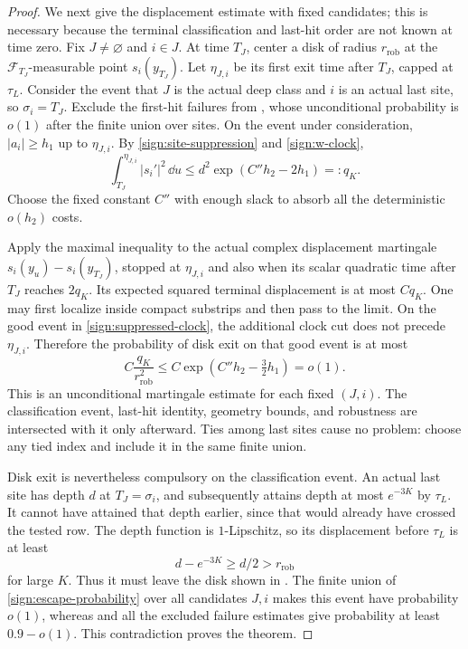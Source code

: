 \begin{proof}
We next give the displacement estimate with fixed candidates; this
is necessary because the terminal classification and last-hit order
are not known at time zero.  Fix \(J\ne\varnothing\) and \(i\in J\).
At time \(T_J\), center a disk of radius \(r_{\mathrm{rob}}\) at
the \(\mathcal F_{T_J}\)-measurable point \(s_i(y_{T_J})\).
Let \(\eta_{J,i}\) be its first exit time after \(T_J\), capped at
\(\tau_L\).  Consider the event that \(J\) is the actual deep
class and \(i\) is an actual last site, so \(\sigma_i=T_J\).
Exclude the first-hit failures from , whose
unconditional probability is \(o(1)\) after the finite union over
sites.  On the event under consideration, \(|a_i|\ge h_1\) up to
\(\eta_{J,i}\).  By \eqref{sign:site-suppression} and
\eqref{sign:w-clock},
\begin{equation}\label{sign:suppressed-clock}
 \int_{T_J}^{\eta_{J,i}}|s_i'|^2\,\dd u
       \le d^2\exp(C''h_2-2h_1)=:q_K.
\end{equation}
Choose the fixed constant \(C''\) with enough slack to absorb all
the deterministic \(o(h_2)\) costs.

Apply the maximal inequality to the actual complex displacement
martingale
\(s_i(y_u)-s_i(y_{T_J})\), stopped at \(\eta_{J,i}\) and also
when its scalar quadratic time after \(T_J\) reaches \(2q_K\).
Its expected squared terminal displacement is at most \(Cq_K\).
One may first localize inside compact substrips and then pass to
the limit.  On the good event in \eqref{sign:suppressed-clock},
the additional clock cut does not precede \(\eta_{J,i}\).
Therefore the probability of disk exit on that good event is at
most
\begin{equation}\label{sign:escape-probability}
 C\frac{q_K}{r_{\mathrm{rob}}^2}
 \le C\exp(C''h_2-\tfrac32h_1)=o(1).
\end{equation}
This is an unconditional martingale estimate for each fixed
\((J,i)\).  The classification event, last-hit identity, geometry
bounds, and robustness are intersected with it only afterward.
Ties among last sites cause no problem: choose any tied index and
include it in the same finite union.



Disk exit is nevertheless compulsory on the classification event.
An actual last site has depth \(d\) at \(T_J=\sigma_i\), and
subsequently attains depth at most \(e^{-3K}\) by \(\tau_L\).
It cannot have attained that depth earlier, since that would already
have crossed the tested row.  The depth function is
\(1\)-Lipschitz, so its displacement before \(\tau_L\) is at least
\[
 d-e^{-3K}\ge d/2>r_{\mathrm{rob}}
\]
for large \(K\).  Thus it must leave the disk shown in
.  The finite union of
\eqref{sign:escape-probability} over all candidates \(J,i\) makes
this event have probability \(o(1)\), whereas
 and all the excluded failure estimates give
probability at least \(0.9-o(1)\).  This contradiction proves the
theorem.
\end{proof}

